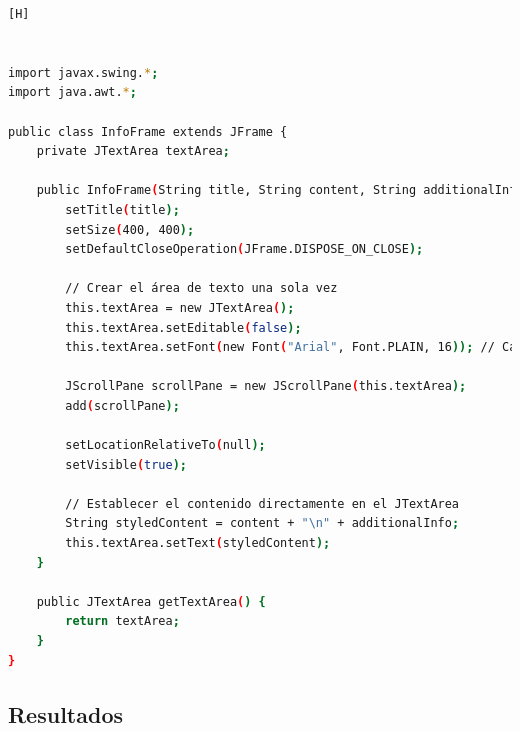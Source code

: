 \documentclass{article}
\begin{document}
	\begin{lstlisting}[language=bash,caption={CLASE InfoFrame}][H]
	

import javax.swing.*;
import java.awt.*;

public class InfoFrame extends JFrame {
    private JTextArea textArea;

    public InfoFrame(String title, String content, String additionalInfo) {
        setTitle(title);
        setSize(400, 400);
        setDefaultCloseOperation(JFrame.DISPOSE_ON_CLOSE);

        // Crear el área de texto una sola vez
        this.textArea = new JTextArea();
        this.textArea.setEditable(false);
        this.textArea.setFont(new Font("Arial", Font.PLAIN, 16)); // Cambia el tipo de fuente y el tamaño

        JScrollPane scrollPane = new JScrollPane(this.textArea);
        add(scrollPane);

        setLocationRelativeTo(null);
        setVisible(true);

        // Establecer el contenido directamente en el JTextArea
        String styledContent = content + "\n" + additionalInfo;
        this.textArea.setText(styledContent);
    }

    public JTextArea getTextArea() {
        return textArea;
    }
}

	\end{lstlisting}	
	
	
	\subsection{Resultados}
	
\end{document}
